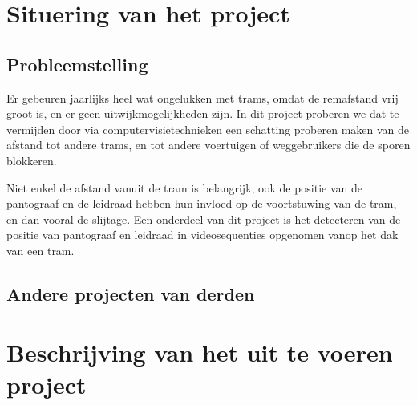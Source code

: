 \documentclass[]{book}
\begin{document}
\section{Situering van het project}\label{sec:Situering}

\subsection{Probleemstelling}\label{sec:Probleemstelling}

%

Er gebeuren jaarlijks heel wat ongelukken met trams, omdat de remafstand vrij groot is, en er geen uitwijkmogelijkheden zijn. In dit project proberen we dat te vermijden door via computervisietechnieken een schatting proberen maken van de afstand tot andere trams, en tot andere voertuigen of weggebruikers die de sporen blokkeren. 

Niet enkel de afstand vanuit de tram is belangrijk, ook de positie van de pantograaf en de leidraad hebben hun invloed op de voortstuwing van de tram, en dan vooral de slijtage. Een onderdeel van dit project is het
detecteren van de positie van pantograaf en leidraad in videosequenties opgenomen vanop het dak van een tram.

\subsection{Andere projecten van derden}\label{sec:Andere}



\section{Beschrijving van het uit te voeren project}\label{sec:Beschrijving}
\end{document}
